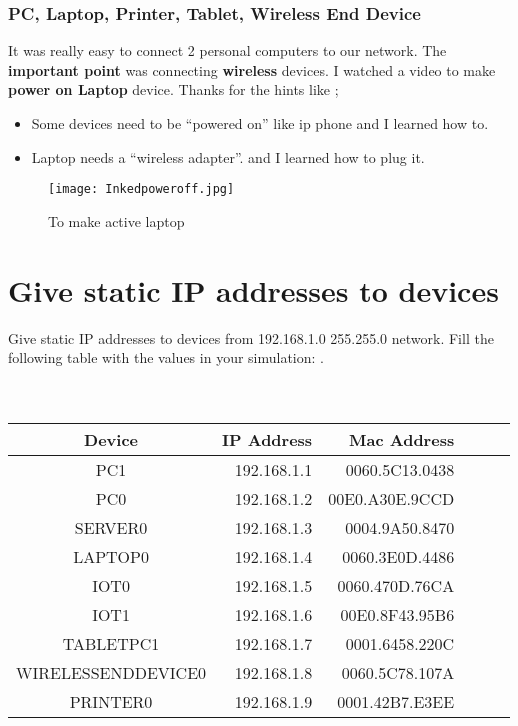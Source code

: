 \documentclass[onecolumn]{article}
\begin{document}
\subsubsection{PC, Laptop, Printer, Tablet, Wireless End Device}
\label{sec:2.0.4}

It was really easy to connect 2 personal computers to our network. The\textbf{ important point} was connecting \textbf{wireless} devices. I watched a video to make \textbf{power on Laptop }device. Thanks for the hints like ;
\begin{itemize}
\item Some devices need to be “powered on” like ip phone and I learned how to.
\item Laptop needs a “wireless adapter”. and I learned how to plug it.
\end{itemize}





\begin{figure}[ht!]
\centering
\texttt{[image: Inkedpoweroff.jpg]}
\caption{To make active laptop \label{}}
\end{figure}


\section{Give static IP addresses to devices}
\label{sec:3}

Give static IP addresses to devices from 192.168.1.0 255.255.0 network. Fill the following table with the values in your simulation:
.\\\\\\
\begin {tabular}{crrrrl}
\hline
Device & IP Address  & Mac Address
  \\
\hline
  PC1&192.168.1.1
&0060.5C13.0438 \\
 PC0&192.168.1.2
 & 00E0.A30E.9CCD\\
 SERVER0& 192.168.1.3
&0004.9A50.8470 \\ 
 LAPTOP0& 192.168.1.4
&0060.3E0D.4486 \\  IOT0&192.168.1.5 
& 0060.470D.76CA\\  IOT1& 192.168.1.6
&00E0.8F43.95B6\\  TABLETPC1& 192.168.1.7
&0001.6458.220C\\  WIRELESSENDDEVICE0& 192.168.1.8
&0060.5C78.107A\\  PRINTER0& 192.168.1.9
&0001.42B7.E3EE
\hline
\end{tabular}
\\\\
\end{document}
